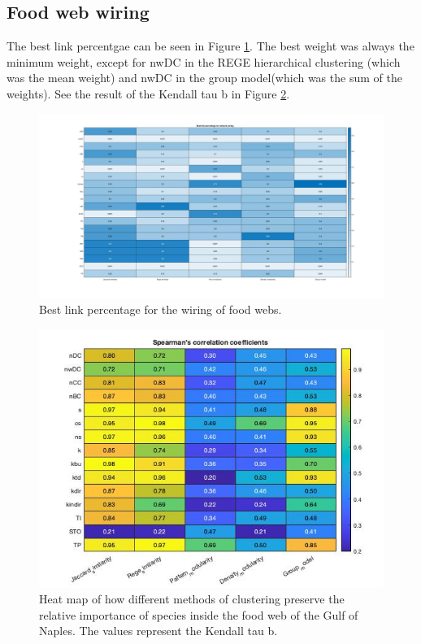 \documentclass[twocolumn]{article}
\begin{document}
	\subsection*{Food web wiring}
	The best link percentgae can be seen in Figure \ref{fig:linkpercentage}. The best weight was always the minimum weight, except for nwDC in the REGE hierarchical clustering (which was the mean weight) and nwDC in the group model(which was the sum of the weights). See the result of the Kendall tau b in Figure \ref{fig:heatmap}.
		\begin{figure}[htbp]%
			\centering
			\includegraphics[width=.8\linewidth]{best_weight.jpg}
			\caption{Best link percentage for the wiring of food webs.}
			\label{fig:linkpercentage}
		\end{figure}
		\begin{figure}
			\centering
			\includegraphics[width=1\linewidth]{results.jpg}
			\caption{Heat map of how different methods of clustering preserve the relative importance of species inside the food web of the Gulf of Naples. The values represent the Kendall tau b.}
			\label{fig:heatmap}
		\end{figure}
\end{document}
